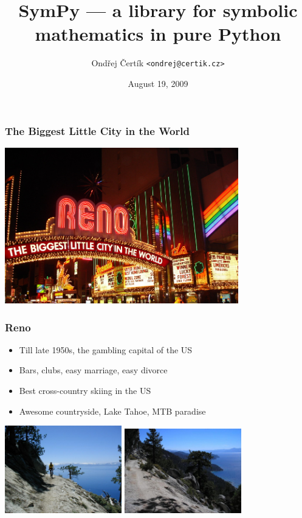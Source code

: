 \documentclass[handout]{beamer}
\title{SymPy --- a library for symbolic mathematics \linebreak in pure Python}
\author{Ondřej Čertík \texttt{<ondrej@certik.cz>}}
\institute[PWR]{University of Nevada, Reno\linebreak SymPy Development Team}
\date{August 19, 2009}
\begin{document}

\frame{\titlepage}

\begin{frame}[fragile]
    \frametitle{The Biggest Little City in the World}
    \begin{center}
        \includegraphics[width=4in]{images/Renoarch.jpg}
    \end{center}
\end{frame}

\begin{frame}[fragile]
    \frametitle{Reno}
    \begin{itemize}
        \item Till late 1950s, the gambling capital of the US
        \item Bars, clubs, easy marriage, easy divorce
        \item Best cross-country skiing in the US
        \item Awesome countryside, Lake Tahoe, MTB paradise
    \end{itemize}
    \begin{center}
        \includegraphics[width=2in]{images/tahoe1.jpg}
        \includegraphics[width=2in]{images/tahoe2.jpg}
    \end{center}
\end{frame}
\end{document}
